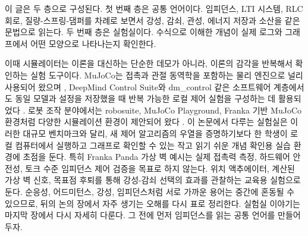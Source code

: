 이 글은 두 층으로 구성된다.
첫 번째 층은 공통 언어이다.
임피던스, LTI 시스템, RLC 회로, 질량-스프링-댐퍼를 차례로 보면서 강성, 감쇠, 관성, 에너지 저장과 소산을 같은 문법으로 읽는다.
두 번째 층은 실험실이다.
수식으로 이해한 개념이 실제 로그와 그래프에서 어떤 모양으로 나타나는지 확인한다.

이때 시뮬레이터는 이론을 대신하는 단순한 데모가 아니라, 이론의 감각을 반복해서 확인하는 실험 도구이다.
MuJoCo는 접촉과 관절 동역학을 포함하는 물리 엔진으로 널리 사용되어 왔으며 \cite{todorov2012mujoco}, DeepMind Control Suite와 dm\_control 같은 소프트웨어 계층에서도 동일 모델과 설정을 저장했을 때 반복 가능한 로컬 제어 실험을 구성하는 데 활용되었다 \cite{tassa2018deepmindcontrolsuite,tassa2020dmcontrol}.
로봇 조작 분야에서는 robosuite, MuJoCo Playground, Franka 기반 MuJoCo 환경처럼 다양한 시뮬레이션 환경이 제안되어 왔다 \cite{zhu2020robosuite,zakka2025mujocoplayground,xu2024frankamujocoenvs}.
이 논문에서 다루는 실험실은 이러한 대규모 벤치마크와 달리, 새 제어 알고리즘의 우열을 증명하기보다 한 학생이 로컬 컴퓨터에서 실행하고 그래프로 확인할 수 있는 작고 읽기 쉬운 개념 확인용 실습 환경에 초점을 둔다.
특히 Franka Panda 가상 벽 예시는 실제 접촉력 측정, 하드웨어 안전성, 토크 수준 임피던스 제어 검증을 목표로 하지 않는다.
위치 액추에이터, 계산된 가상 벽 신호, 목표점 후퇴를 통해 강성-감쇠 선택의 효과를 관찰하는 교육용 실험으로 둔다.
순응성, 어드미턴스, 강성, 임피던스처럼 서로 가까운 용어는 중간에 혼동될 수 있으므로, 뒤의 논의 장에서 자주 생기는 오해를 다시 표로 정리한다.
실험실 이야기는 마지막 장에서 다시 자세히 다룬다.
그 전에 먼저 임피던스를 읽는 공통 언어를 만들어 두자.

